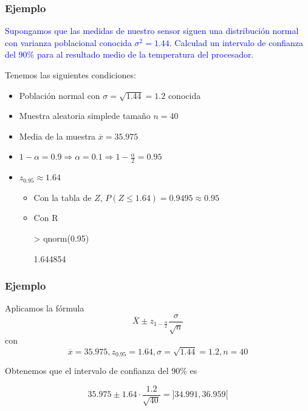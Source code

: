 \documentclass[12pt,t]{beamer}
\newcommand{\blue}[1]{\textcolor{blue}{#1}}
\renewcommand{\leq}{\leqslant}
\theoremstyle{plain}
\theoremstyle{definition}
\begin{document}
\begin{frame}[fragile]
\frametitle{Ejemplo}
\vspace*{-3ex}

\blue{Supongamos  que las medidas de nuestro sensor siguen  una distribución normal con varianza poblacional conocida $\sigma^2=1.44$. Calculad un intervalo de confianza  del 90\% para al resultado medio de la temperatura del procesador.}
\medskip

Tenemos las siguientes condiciones:
\begin{itemize}
\item Población normal con $\sigma=\sqrt{1.44}=1.2$ conocida
\item Muestra aleatoria simplede  tamaño  $n=40$
\item Media de la muestra  $\overline{x}=35.975$
\item $1-\alpha=0.9\Rightarrow \alpha=0.1\Rightarrow 1-\frac{\alpha}{2}=0.95$
\item $z_{0.95}\approx 1.64$
\begin{itemize}
\item Con la tabla de $Z$, $P(Z\leq 1.64)=0.9495\approx 0.95$
\item Con R
\begin{Schunk}
\begin{Sinput}
> qnorm(0.95)
\end{Sinput}
\begin{Soutput}
[1] 1.644854
\end{Soutput}
\end{Schunk}
\end{itemize}
\end{itemize}

\end{frame}


\begin{frame}
\frametitle{Ejemplo}
Aplicamos la fórmula
$$
\overline{X}\pm z_{1-\frac{\alpha}{2}} \frac{\sigma}{\sqrt{n}}
$$
con
$$
\overline{x}=35.975, z_{0.95}=1.64, \sigma=\sqrt{1.44}=1.2, n=40
$$

Obtenemos que el intervalo de confianza  del 90\% es 

$$
35.975\pm 1.64\cdot\frac{1.2}{\sqrt{40}}=
]34.991 , 36.959[
$$

\end{frame}
\end{document}
